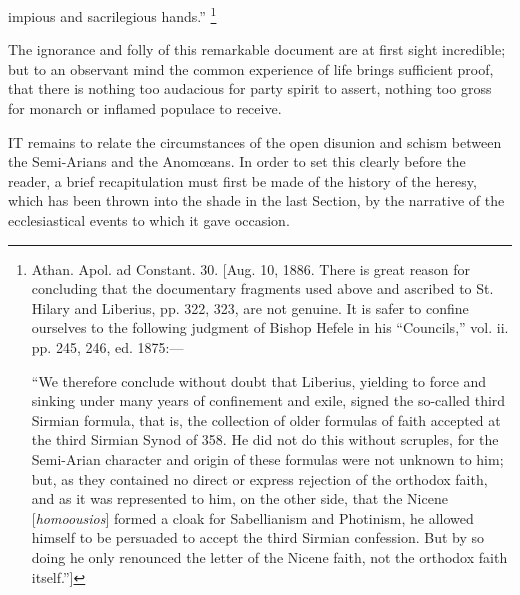 impious and sacrilegious hands.'' \footnote{Athan. Apol. ad Constant. 30. [Aug. 10,
1886. There is great reason for concluding that the documentary
fragments used above and ascribed to St. Hilary and Liberius, pp. 322,
323, are not genuine. It is safer to confine ourselves to the
following judgment of Bishop Hefele in his ``Councils,'' vol.
ii. pp. 245, 246, ed. 1875:—

``We therefore conclude without
doubt that Liberius, yielding to force and sinking under many years of
confinement and exile, signed the so-called third Sirmian formula,
that is, the collection of older formulas of faith accepted at the
third Sirmian Synod of 358. He did not do this without scruples, for
the Semi-Arian character and origin of these formulas were not unknown
to him; but, as they contained no direct or express rejection of the
orthodox faith, and as it was represented to him, on the other side,
that the Nicene [\emph{homoousios}] formed a cloak for Sabellianism
and Photinism, he allowed himself to be persuaded to accept the third
Sirmian confession. But by so doing he only renounced the letter of
the Nicene faith, not the orthodox faith itself.'']}

The ignorance and folly of this remarkable document are at first
sight incredible; but to an observant mind the common experience of
life brings sufficient proof, that there is nothing too audacious for
party spirit to assert, nothing too gross for monarch or inflamed
populace to receive.


IT remains to relate the circumstances
of the open disunion and schism between the Semi-Arians and the
Anomœans. In order to set this clearly before the reader, a brief
recapitulation must first be made of the history of the heresy, which
has been thrown into the shade in the last Section, by the narrative
of the ecclesiastical events to which it gave occasion.

